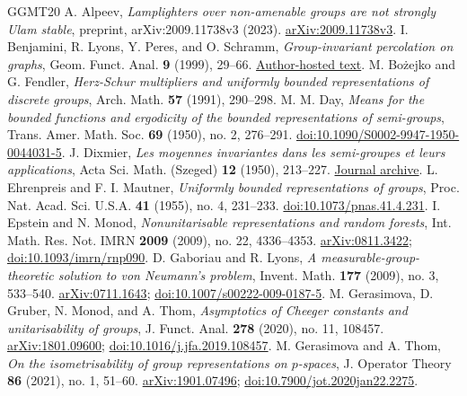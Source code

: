 \documentclass[a4paper,11pt]{amsproc}
\numberwithin{equation}{section}
\theoremstyle{definition}
\begin{document}
\enlargethispage{2\baselineskip}
\begin{thebibliography}{GGMT20}
 A. Alpeev, \emph{Lamplighters over non-amenable groups are not strongly Ulam stable}, preprint, arXiv:2009.11738v3 (2023). \href{https://arxiv.org/abs/2009.11738v3}{arXiv:2009.11738v3}.
 I. Benjamini, R. Lyons, Y. Peres, and O. Schramm, \emph{Group-invariant percolation on graphs}, Geom. Funct. Anal. \textbf{9} (1999), 29--66. \href{https://rdlyons.pages.iu.edu/pdf/invar.pdf}{Author-hosted text}.
 M. Bo\.{z}ejko and G. Fendler, \emph{Herz-Schur multipliers and uniformly bounded representations of discrete groups}, Arch. Math. \textbf{57} (1991), 290--298.
 M. M. Day, \emph{Means for the bounded functions and ergodicity of the bounded representations of semi-groups}, Trans. Amer. Math. Soc. \textbf{69} (1950), no. 2, 276--291. \href{https://doi.org/10.1090/S0002-9947-1950-0044031-5}{doi:10.1090/S0002-9947-1950-0044031-5}.
 J. Dixmier, \emph{Les moyennes invariantes dans les semi-groupes et leurs applications}, Acta Sci. Math. (Szeged) \textbf{12} (1950), 213--227. \href{https://acta.bibl.u-szeged.hu/13605/}{Journal archive}.
 L. Ehrenpreis and F. I. Mautner, \emph{Uniformly bounded representations of groups}, Proc. Nat. Acad. Sci. U.S.A. \textbf{41} (1955), no. 4, 231--233. \href{https://doi.org/10.1073/pnas.41.4.231}{doi:10.1073/pnas.41.4.231}.
 I. Epstein and N. Monod, \emph{Nonunitarisable representations and random forests}, Int. Math. Res. Not. IMRN \textbf{2009} (2009), no. 22, 4336--4353. \href{https://arxiv.org/abs/0811.3422}{arXiv:0811.3422}; \href{https://doi.org/10.1093/imrn/rnp090}{doi:10.1093/imrn/rnp090}.
 D. Gaboriau and R. Lyons, \emph{A measurable-group-theoretic solution to von Neumann's problem}, Invent. Math. \textbf{177} (2009), no. 3, 533--540. \href{https://arxiv.org/abs/0711.1643}{arXiv:0711.1643}; \href{https://doi.org/10.1007/s00222-009-0187-5}{doi:10.1007/s00222-009-0187-5}.
 M. Gerasimova, D. Gruber, N. Monod, and A. Thom, \emph{Asymptotics of Cheeger constants and unitarisability of groups}, J. Funct. Anal. \textbf{278} (2020), no. 11, 108457. \href{https://arxiv.org/abs/1801.09600}{arXiv:1801.09600}; \href{https://doi.org/10.1016/j.jfa.2019.108457}{doi:10.1016/j.jfa.2019.108457}.
 M. Gerasimova and A. Thom, \emph{On the isometrisability of group representations on $p$-spaces}, J. Operator Theory \textbf{86} (2021), no. 1, 51--60. \href{https://arxiv.org/abs/1901.07496}{arXiv:1901.07496}; \href{https://doi.org/10.7900/jot.2020jan22.2275}{doi:10.7900/jot.2020jan22.2275}.

\end{thebibliography}
\end{document}
